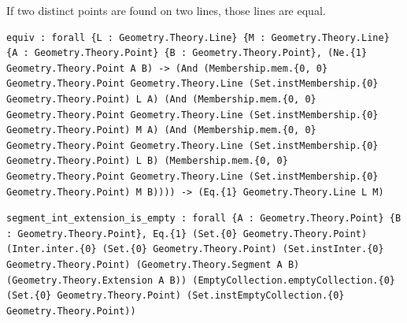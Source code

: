 \begin{theorem}
  \label{Geometry.Theory.Line.equiv}
  \leanok
  If two distinct points are found on two lines, those lines are equal. 
\begin{verbatim}equiv : forall {L : Geometry.Theory.Line} {M : Geometry.Theory.Line} {A : Geometry.Theory.Point} {B : Geometry.Theory.Point}, (Ne.{1} Geometry.Theory.Point A B) -> (And (Membership.mem.{0, 0} Geometry.Theory.Point Geometry.Theory.Line (Set.instMembership.{0} Geometry.Theory.Point) L A) (And (Membership.mem.{0, 0} Geometry.Theory.Point Geometry.Theory.Line (Set.instMembership.{0} Geometry.Theory.Point) M A) (And (Membership.mem.{0, 0} Geometry.Theory.Point Geometry.Theory.Line (Set.instMembership.{0} Geometry.Theory.Point) L B) (Membership.mem.{0, 0} Geometry.Theory.Point Geometry.Theory.Line (Set.instMembership.{0} Geometry.Theory.Point) M B)))) -> (Eq.{1} Geometry.Theory.Line L M)\end{verbatim}
\end{theorem}

\begin{theorem}
  \label{Geometry.Theory.Line.segment_int_extension_is_empty}
  \leanok
\begin{verbatim}segment_int_extension_is_empty : forall {A : Geometry.Theory.Point} {B : Geometry.Theory.Point}, Eq.{1} (Set.{0} Geometry.Theory.Point) (Inter.inter.{0} (Set.{0} Geometry.Theory.Point) (Set.instInter.{0} Geometry.Theory.Point) (Geometry.Theory.Segment A B) (Geometry.Theory.Extension A B)) (EmptyCollection.emptyCollection.{0} (Set.{0} Geometry.Theory.Point) (Set.instEmptyCollection.{0} Geometry.Theory.Point))\end{verbatim}
\end{theorem}

